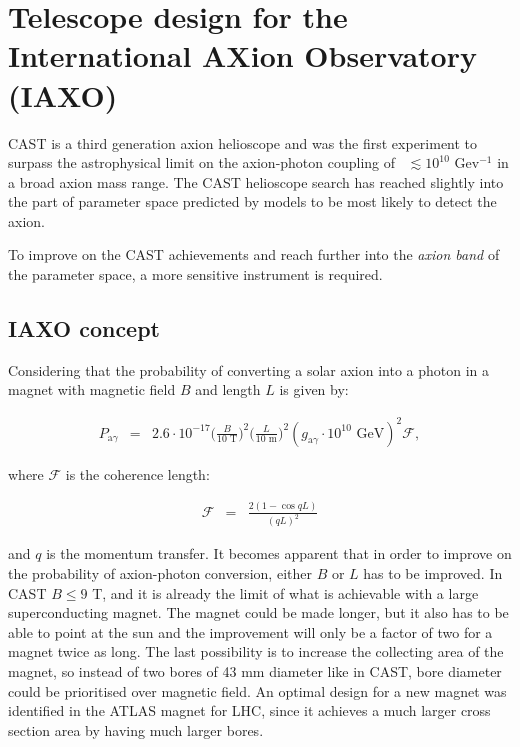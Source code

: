 \chapter{Telescope design for the International AXion Observatory (IAXO)}\label{chap:iaxo}
CAST is a third generation axion helioscope and was the first experiment to surpass the astrophysical limit on the axion-photon coupling of \gay\ $\lesssim 10^{10}$ Gev$^{-1}$ in a broad axion mass range. The CAST helioscope search has reached slightly into the part of parameter space predicted by models to be most likely to detect the axion.

To improve on the CAST achievements and reach further into the \emph{axion band} of the parameter space, a more sensitive instrument is required.

\section{IAXO concept}
Considering that the probability of converting a solar axion into a photon in a magnet with magnetic field $B$ and length $L$ is given by\cite{Andriamonje:2007jc,Zioutas:2005jl,Sikivie:1983wx}:

\begin{eqnarray}
  P_{\text{a}\gamma} &=& 2.6\cdot10^{-17}\bigg(\frac{B}{10\text{ T}}\bigg)^2\bigg(\frac{L}{10\text{ m}}\bigg)^2(g_{\text{a}\gamma}\cdot10^{10}\text{\ GeV})^2\mathcal{F},
\end{eqnarray}

where $\mathcal{F}$ is the coherence length:

\begin{eqnarray}
  \mathcal{F} &=& \frac{2(1-\cos{qL})}{(qL)^2}
\end{eqnarray}

and $q$ is the momentum transfer. It becomes apparent that in order to improve on the probability of axion-photon conversion, either $B$ or $L$ has to be improved. In CAST $B \leq 9$ T, and it is already the limit of what is achievable with a large superconducting magnet. The magnet could be made longer, but it also has to be able to point at the sun and the improvement will only be a factor of two for a magnet twice as long. The last possibility is to increase the collecting area of the magnet, so instead of two bores of 43 mm diameter like in CAST, bore diameter could be prioritised over magnetic field. An optimal design for a new magnet was identified\cite{Irastorza:1340820} in the ATLAS magnet for LHC\cite{Collaboration:1997vu}, since it achieves a much larger cross section area by having much larger bores.

